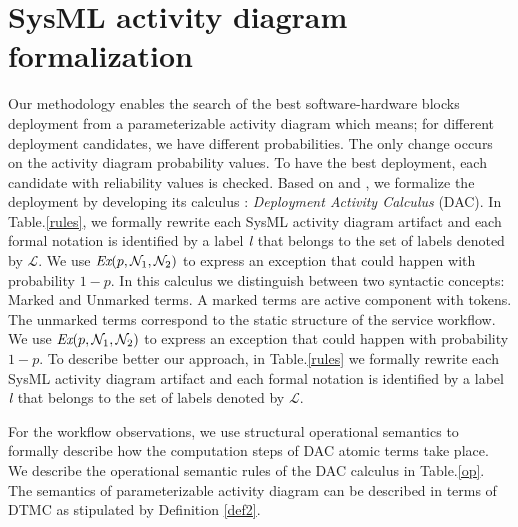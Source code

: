 \documentclass[3p,times,procedia,authoryear,round]{elsarticle}
\begin{document}
\section{SysML activity diagram formalization}
\label{SysMLActivitydiagramformalization}
Our methodology enables the search  of the best software-hardware blocks deployment from a parameterizable activity diagram which means; for different deployment candidates, we have different probabilities. The only change occurs on the activity diagram probability values.  To have the best deployment, each candidate with reliability values is checked. Based on \citep{Ouchani20142713} and \citep{Baouya20157493}, we formalize the deployment by developing its calculus : \emph{Deployment Activity Calculus} (DAC). In Table.\ref{rules}, we formally rewrite each SysML activity diagram artifact and each formal notation is identified by a label $\emph{l}$ that belongs to the set of labels denoted by $\mathcal{L}$. We use $\emph{Ex}(p,\mathcal{N}_{1},\mathcal{N}_{2})$ to express an exception that could  happen with probability $1-p$. In this calculus we distinguish between two syntactic concepts: Marked and Unmarked terms. A marked terms are active component with tokens. The unmarked terms correspond to the static structure of the service workflow. We use $\emph{Ex}(p,\mathcal{N}_{1},\mathcal{N}_{2})$ to express an exception that could  happen with probability $1-p$. To describe better our approach, in Table.\ref{rules} we formally rewrite each SysML activity diagram artifact and each formal notation is identified by a label $\emph{l}$ that belongs to the set of labels denoted by $\mathcal{L}$.


For the workflow observations, we use structural operational semantics \citep{Milner1999}  to formally describe how the computation steps of DAC atomic terms take place. We describe the operational semantic rules of the DAC calculus in Table.\ref {op}.  The semantics of parameterizable activity diagram can be described in terms of DTMC as stipulated by Definition \ref{def2}.
\end{document}
